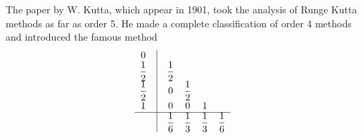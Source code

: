 \documentclass[a4paper,oneside]{book}
\numberwithin{equation}{chapter}
\begin{document}
The paper by W. Kutta, which appear in 1901, took the analysis of Runge Kutta methods as far as order 5. He made a complete classification of order 4 methods and introduced the famous method
\begin{align}
\begin{array}{*{20}{c}}
0&\vline& {}&{}&{}&{}\\
{\dfrac{1}{2}}&\vline& {\dfrac{1}{2}}&{}&{}&{}\\
{\dfrac{1}{2}}&\vline& 0&{\dfrac{1}{2}}&{}&{}\\
1&\vline& 0&0&1&{}\\
\hline
{}&\vline& {\dfrac{1}{6}}&{\dfrac{1}{3}}&{\dfrac{1}{3}}&{\dfrac{1}{6}}
\end{array}
\end{align}
\end{document}
